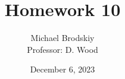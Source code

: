 


\title{Homework 10}
\date{December 6, 2023}
\author{Michael Brodskiy\\ \small Professor: D. Wood}



\maketitle

